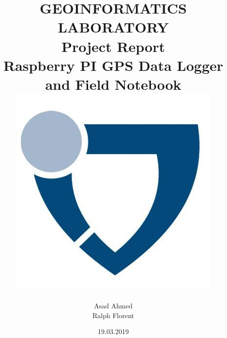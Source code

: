 \documentclass[12pt,a4paper]{article}
\title{
{GEOINFORMATICS LABORATORY}\\
{\large Project Report}\\
{\small Raspberry PI GPS Data Logger and Field Notebook}
\vspace{1.4cm}
{\includegraphics[scale=0.45]{jacobs_logo.jpeg}}}
\author{Asad Ahmed\\Ralph Florent}
\date{19.03.2019}
\begin{document}
\maketitle
\newpage

\tableofcontents
\newpage




\newpage


\newpage

\nocite{*}


\end{document}
